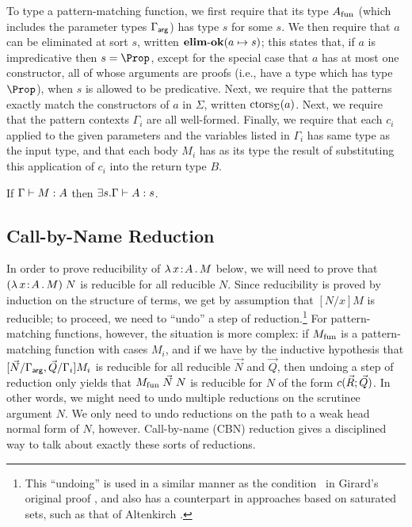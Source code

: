 \documentclass{article}
\begin{document}
To type a pattern-matching function, we first require that its type
$A_{\mathrm{fun}}$ (which includes the parameter types $\Gamma_{\mathsf{arg}}$) has type $s$
for some $s$. We then require that $a$ can be eliminated at sort
$s$, written $\mathbf{elim\text{-}ok}(a\mapsto s)$; this states that, if $a$ is
impredicative then $s=\Prop$, except for the special case that $a$ has
at most one constructor, all of whose arguments are proofs (i.e., have
a type which has type $\Prop$), when $s$ is allowed to be
predicative. Next, we require that the patterns exactly match
the constructors of $a$ in $\Sigma$, written
$\mathrm{ctors}_{\Sigma}(a)$. Next, we require that the pattern contexts $\Gamma_i$ are
all well-formed. Finally, we require that each $c_i$ applied to the
given parameters and the variables listed in $\Gamma_i$ has same type
as the input type, and that each body $M_i$ has as its type the result
of substituting this application of $c_i$ into the return type $B$.


\begin{lemma}
  \label{lemma:type-typing}
  If $\Gamma \vdash M : A$ then $\exists s.\Gamma \vdash A : s$.
\end{lemma}

\iftechreport

\subsection{Call-by-Name Reduction}
\label{subsec:cbn}

In order to prove reducibility of $\lambda\,x \! : \! A \,.\, M$ below, we will
need to prove that $(\lambda\,x \! : \! A \,.\, M)\;N$ is reducible for all
reducible $N$.  Since reducibility is proved by induction on the
structure of terms, we get by assumption that $[N/x]M$ is reducible;
to proceed, we need to ``undo'' a step of reduction.\footnote{This
  ``undoing'' is used in a similar manner as the condition \CRthree\
  in Girard's original proof \cite{girard-proofs-types}, and also has
  a counterpart in approaches based on saturated sets, such as that of
  Altenkirch \cite{altenkirch93}.} For pattern-matching functions,
however, the situation is more complex: if $M_{\mathrm{fun}}$ is a
pattern-matching function with cases $M_i$, and if we have by the
inductive hypothesis that $[\vec{N}/\Gamma_{\mathsf{arg}},\vec{Q}/\Gamma_i]M_i$ is
reducible for all reducible $\vec{N}$ and $\vec{Q}$, then undoing a
step of reduction only yields that $M_{\mathrm{fun}}\;\vec{N}\;N$ is reducible
for $N$ of the form $c(\vec{R}; \vec{Q})$.  In other words,
we might need to undo multiple reductions on the scrutinee argument
$N$. We only need to undo reductions on the path to a weak head normal
form of $N$, however. Call-by-name (CBN) reduction gives a disciplined
way to talk about exactly these sorts of reductions.
\end{document}
